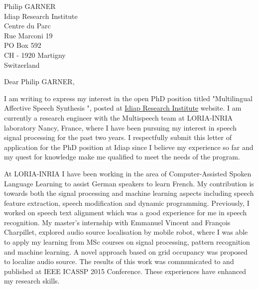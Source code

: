 \documentclass[
	pagenumber=false, %
	parskip=half, %
	fromalign=right, %
	foldmarks=true, %
	addrfield=true %
	]{scrlttr2}
\date{\today} %
\begin{document}
 
\begin{letter}{Philip GARNER \\ Idiap Research Institute\\ Centre du Parc \\ Rue Marconi 19  \\ PO Box 592 \\CH - 1920 Martigny \\Switzerland} %



\opening{Dear Philip GARNER,}



		I am writing to express my interest in the open PhD position titled "Multilingual Affective Speech Synthesis ", posted at \href{https://www.idiap.ch/education-and-jobs}{Idiap Research Institute} website. I am currently a research engineer with the Multispeech team at LORIA-INRIA laboratory Nancy, France, where I have been pursuing my interest in speech signal processing for the past two years. I respectfully submit this letter of application for the PhD position at 
Idiap since I believe my experience so far and my quest for knowledge 
make me qualified to meet the needs of the program. 
		
		At LORIA\--INRIA I have been working in the area of Computer-Assisted Spoken Language Learning to assist German speakers to learn French. My contribution is towards both the signal processing and machine learning aspects including speech feature extraction, speech modification and dynamic programming. Previously, I worked on speech text alignment which was a good experience for me in speech recognition. My master's internship with Emmanuel Vincent and François Charpillet, explored audio source localisation by mobile robot, where I was able to apply my learning from MSc courses on signal processing, pattern recognition and machine learning. A novel approach based on grid occupancy was proposed to localize audio source. The results of this work was communicated to and  published at IEEE ICASSP 2015 Conference. These experiences have enhanced my research skills.   


\end{letter}
\end{document}
